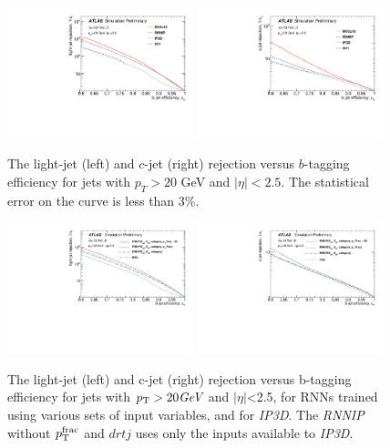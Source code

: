 \begin{figure}[htbp]
  \centering
 \includegraphics[width=0.48\textwidth]{figures/RNN/BL_ROC.pdf}
 \includegraphics[width=0.48\textwidth]{figures/RNN//BC_ROC.pdf}
\caption{The light-jet (left) and $c$-jet (right) rejection versus $b$-tagging efficiency for jets with $p_T > 20$ GeV and $|\eta|<2.5$. The statistical error on the curve is less than 3\%.}
  \label{fig:ROC}
\end{figure}

\begin{figure}[htbp]
  \centering
 \includegraphics[width=0.48\textwidth]{figures/RNN/BL_ROC_RNNComp.pdf}
 \includegraphics[width=0.48\textwidth]{figures/RNN//BC_ROC_RNNComp.pdf}
 \caption{The light-jet (left) and c-jet (right) rejection versus b-tagging efficiency for jets with $p_{{\rm T}} > 20 \textit{GeV}$ and $|\eta|$<2.5, for RNNs trained using various sets of input variables, and for \textit{IP3D}. The \textit{RNNIP} without $p_{\rm T}^{\rm frac}$ and $drtj$ uses only the inputs available to \textit{IP3D}.}
  \label{fig:IP3D-RNN}
\end{figure}



